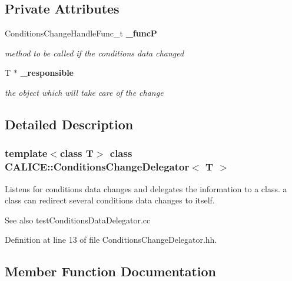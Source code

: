 \subsection*{Private Attributes}
\begin{DoxyCompactItemize}
\item 
ConditionsChangeHandleFunc\_\-t {\bf \_\-funcP}\label{classCALICE_1_1ConditionsChangeDelegator_adaf17b9ce91ac651de46c007b69f5719}

\begin{DoxyCompactList}\small\item\em method to be called if the conditions data changed \item\end{DoxyCompactList}\item 
T $\ast$ {\bf \_\-responsible}\label{classCALICE_1_1ConditionsChangeDelegator_a0d8f29b22856a229930ee6246ad066fd}

\begin{DoxyCompactList}\small\item\em the object which will take care of the change \item\end{DoxyCompactList}\end{DoxyCompactItemize}


\subsection{Detailed Description}
\subsubsection*{template$<$class T$>$ class CALICE::ConditionsChangeDelegator$<$ T $>$}

Listens for conditions data changes and delegates the information to a class. a class can redirect several conditions data changes to itself. \begin{DoxySeeAlso}{See also}
testConditionsDataDelegator.cc 
\end{DoxySeeAlso}


Definition at line 13 of file ConditionsChangeDelegator.hh.

\subsection{Member Function Documentation}
